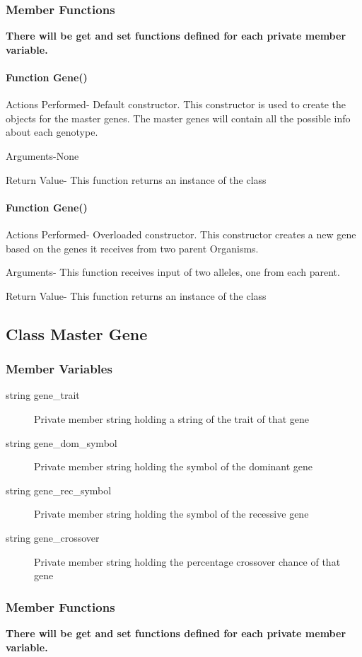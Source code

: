 \documentclass{article}
\begin{document}
\subsubsection{Member Functions}
\textbf{There will be get and set functions defined for each private member variable.}
\paragraph{Function Gene()}
Actions Performed- Default constructor. This constructor is used to create the objects for the master genes. The master genes will contain all the possible info about each genotype.
                 
Arguments-None
                    
Return Value- This function returns an instance of the class

\paragraph{Function Gene()}
Actions Performed- Overloaded constructor. This constructor creates a new gene based on the genes it receives from two parent Organisms.
                 
Arguments- This function receives input of two alleles, one from each parent.
                    
Return Value- This function returns an instance of the class

\newpage
\subsection{Class Master Gene}
\subsubsection{Member Variables}
\begin{description}
\item[string gene\_trait] Private member string holding a string of the trait of that gene
\item[string gene\_dom\_symbol] Private member string holding the symbol of the dominant gene
\item[string gene\_rec\_symbol] Private member string holding the symbol of the recessive gene
\item[string gene\_crossover] Private member string holding the percentage crossover chance of that gene
\end{description}
\subsubsection{Member Functions}
\textbf{There will be get and set functions defined for each private member variable.}
\end{document}

